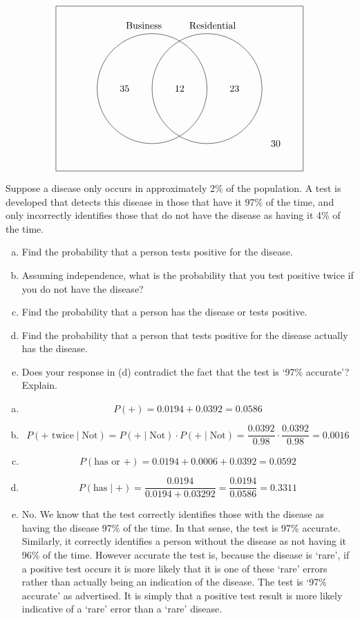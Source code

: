 \documentclass[11pt,letterpaper]{article}
\begin{document}
	\[
	\begin{tikzpicture}
	\draw (0,0) rectangle (9,6);
	\draw (3.5,3) circle (2);
	\draw (5.5,3) circle (2);
	
	\node at (3.2,5.3) {Business};
	\node at (5.7,5.3) {Residential}; 
	
	\node at (2.5,3) {35};
	\node at (4.5,3) {12};
	\node at (6.5,3) {23};
	\node at (8,1) {30};
	\end{tikzpicture}
	\]



\newpage



 Suppose a disease only occurs in approximately 2\% of the population. A test is developed that detects this disease in those that have it 97\% of the time, and only incorrectly identifies those that do not have the disease as having it 4\% of the time. 
	\begin{enumerate}[(a)]
	\item Find the probability that a person tests positive for the disease. 
	\item Assuming independence, what is the probability that you test positive twice if you do not have the disease?
	\item Find the probability that a person has the disease or tests positive. 
	\item Find the probability that a person that tests positive for the disease actually has the disease. 
	\item Does your response in (d) contradict the fact that the test is `97\% accurate'? Explain. 
	\end{enumerate} \pspace

\sol 
\begin{enumerate}[(a)]
\item 
	\[
	P(\text{+})= 0.0194 + 0.0392= 0.0586
	\]

\item 
	\[
	P(\text{+ twice} \;|\; \text{Not})= P(\text{+} \;|\; \text{Not}) \cdot P(\text{+} \;|\; \text{Not})= \dfrac{0.0392}{0.98} \cdot \dfrac{0.0392}{0.98}= 0.0016
	\]

\item 
	\[
	P(\text{has or +})= 0.0194 + 0.0006 + 0.0392= 0.0592
	\]

\item 
	\[
	P(\text{has} \;|\; \text{+})= \dfrac{0.0194}{0.0194 + 0.03292}= \dfrac{0.0194}{0.0586}= 0.3311
	\]

\item No. We know that the test correctly identifies those with the disease as having the disease 97\% of the time. In that sense, the test is 97\% accurate. Similarly, it correctly identifies a person without the disease as not having it 96\% of the time. However accurate the test is, because the disease is `rare', if a positive test occurs it is more likely that it is one of these `rare' errors rather than actually being an indication of the disease. The test is `97\% accurate' as advertised. It is simply that a positive test result is more likely indicative of a `rare' error than a `rare' disease. 
\end{enumerate} \vfill
\end{document}

